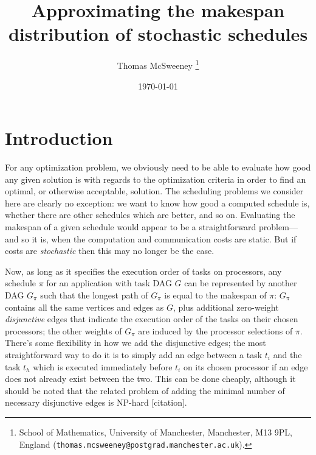 \documentclass[12pt]{article}
\title{Approximating the makespan distribution of stochastic schedules} %
\author{Thomas McSweeney%
	\thanks{%
		School of Mathematics,
		University of Manchester,
		Manchester, M13 9PL, England
		(\texttt{thomas.mcsweeney@postgrad.manchester.ac.uk}).
	}
}
\date{\today}
\begin{document}
	\maketitle 	


\section{Introduction}
\label{sect.intro}


For any optimization problem, we obviously need to be able to evaluate how good any given solution is with regards to the optimization criteria in order to find an optimal, or otherwise acceptable, solution. The scheduling problems we consider here are clearly no exception: we want to know how good a computed schedule is, whether there are other schedules which are better, and so on. Evaluating the makespan of a given schedule would appear to be a straightforward problem---and so it is, when the computation and communication costs are static. But if costs are {\em stochastic} then this may no longer be the case.

Now, as long as it specifies the execution order of tasks on processors, any schedule $\pi$ for an application with task DAG $G$ can be represented by another DAG $G_{\pi}$ such that the longest path of $G_{\pi}$ is equal to the makespan of $\pi$: $G_\pi$ contains all the same vertices and edges as $G$, plus additional zero-weight {\em disjunctive} edges that indicate the execution order of the tasks on their chosen processors; the other weights of $G_\pi$ are induced by the processor selections of $\pi$. There's some flexibility in how we add the disjunctive edges; the most straightforward way to do it is to simply add an edge between a task $t_i$ and the task $t_h$ which is executed immediately before $t_i$ on its chosen processor if an edge does not already exist between the two. This can be done cheaply, although it should be noted that the related problem of adding the minimal number of necessary disjunctive edges is NP-hard [citation]. 
\end{document}
